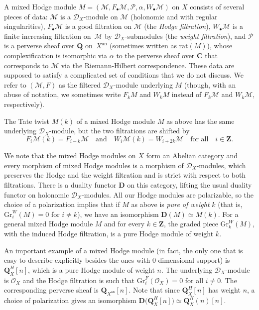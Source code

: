 \documentclass[JEP,XML,SOM,Unicode]{cedram}
\newcommand{\sbullet}{{\scriptscriptstyle\bullet}}
\newcommand{\DXmodule}{$\cD_X$\nobreakdash-mod\-ule\xspace}
\newcommand{\DXmodules}{$\cD_X$\nobreakdash-mod\-ules\xspace}
\theoremstyle{plain}
\theoremstyle{definition}
\newcommand\Z{{\mathbf Z}}
\newcommand\Q{{\mathbf Q}}
\newcommand\C{{\mathbf C}}
\newcommand\cD{\mathcal{D}}
\newcommand\cO{\mathcal{O}}
\newcommand\cM{\mathcal{M}}
\newcommand\cP{\mathcal{P}}
\newcommand\cO{\mathcal{O}}
\newcommand\gr{\mathrm{Gr}}
\begin{document}
A mixed Hodge module $M=(\cM, F_{\sbullet}\cM, {\mathcal P}, \alpha, W_{\sbullet}\cM)$ on $X$ consists of several pieces of data: $\cM$ is a \DXmodule on $\cM$ (holonomic and with regular singularities), $F_{\sbullet}\cM$ is a good filtration on $\cM$ (the \emph{Hodge filtration}), $W_{\sbullet}\cM$ is a finite increasing
filtration on~$\cM$ by $\cD_X$-submodules (the \emph{weight filtration}), and $\cP$
is a perverse sheaf over $\Q$ on~$X^\mathrm{an}$ (sometimes written as $\mathrm{rat}(M)$), whose complexification is isomorphic via $\alpha$ to the perverse sheaf over $\C$ that corresponds to $\cM$ via the
Riemann-Hilbert correspondence. These data are supposed to satisfy a complicated set of conditions that we do not discuss.
We refer to $(\cM,F)$ as the filtered \DXmodule underlying $M$ (though,
with an abuse of notation, we sometimes write $F_kM$ and $W_kM$ instead of $F_k\cM$ and $W_k\cM$, respectively).

The Tate twist $M(k)$ of a mixed Hodge module $M$ as above has the same underlying \DXmodule, but the two filtrations are shifted by
\[F_i\cM(k)=F_{i-k}\cM\quad\text{and}\quad W_i\cM(k)=W_{i+2k}\cM\quad\text{for all}\quad i\in\Z.\]

We note that the mixed Hodge modules on $X$ form an Abelian category and every morphism of mixed Hodge modules is a morphism of \DXmodules, which
preserves the Hodge and the weight filtration and is strict with respect to both filtrations.
There is a duality functor ${\mathbf D}$ on this category, lifting the usual duality functor on holonomic \DXmodules. All our Hodge
modules are polarizable, so the choice of a polarization implies that if $M$ as above is \emph{pure of weight} $k$ (that is, $\gr^W_i(M)=0$ for $i\neq k$), we have an isomorphism
${\mathbf D}(M)\simeq M(k)$. For a general mixed Hodge module $M$ and for every $k\in\Z$, the graded piece $\gr_k^W(M)$, with the induced Hodge filtration, is a pure
Hodge module of weight $k$.

An important example of a mixed Hodge module (in fact, the only one that is easy to describe explicitly besides the ones with $0$-dimensional support) is $\Q_X^H[n]$, which is a pure Hodge module of weight $n$.
The underlying \DXmodule is $\cO_X$ and the Hodge filtration is such that $\gr^F_i(\cO_X)=0$ for all $i\neq 0$. The corresponding perverse sheaf is $\Q_{X^\mathrm{an}}[n]$.
Note that since $\Q_X^H[n]$ has weight $n$, a choice of polarization gives an isomorphism ${\mathbf D}(\Q_X^H[n]\big)\simeq\Q_X^H(n)[n]$.
\end{document}
